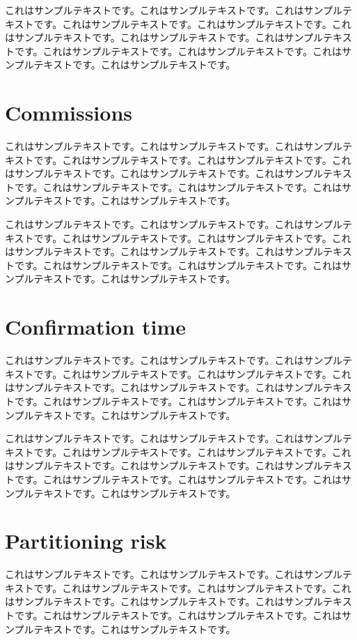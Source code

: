 \documentclass[a4paper, dvipdfmx]{jsarticle}
\begin{document}
これはサンプルテキストです。これはサンプルテキストです。これはサンプルテキストです。これはサンプルテキストです。これはサンプルテキストです。これはサンプルテキストです。これはサンプルテキストです。これはサンプルテキストです。これはサンプルテキストです。これはサンプルテキストです。これはサンプルテキストです。これはサンプルテキストです。

\section{Commissions}
これはサンプルテキストです。これはサンプルテキストです。これはサンプルテキストです。これはサンプルテキストです。これはサンプルテキストです。これはサンプルテキストです。これはサンプルテキストです。これはサンプルテキストです。これはサンプルテキストです。これはサンプルテキストです。これはサンプルテキストです。これはサンプルテキストです。

これはサンプルテキストです。これはサンプルテキストです。これはサンプルテキストです。これはサンプルテキストです。これはサンプルテキストです。これはサンプルテキストです。これはサンプルテキストです。これはサンプルテキストです。これはサンプルテキストです。これはサンプルテキストです。これはサンプルテキストです。これはサンプルテキストです。

\section{Confirmation time}
これはサンプルテキストです。これはサンプルテキストです。これはサンプルテキストです。これはサンプルテキストです。これはサンプルテキストです。これはサンプルテキストです。これはサンプルテキストです。これはサンプルテキストです。これはサンプルテキストです。これはサンプルテキストです。これはサンプルテキストです。これはサンプルテキストです。

これはサンプルテキストです。これはサンプルテキストです。これはサンプルテキストです。これはサンプルテキストです。これはサンプルテキストです。これはサンプルテキストです。これはサンプルテキストです。これはサンプルテキストです。これはサンプルテキストです。これはサンプルテキストです。これはサンプルテキストです。これはサンプルテキストです。

\section{Partitioning risk}
これはサンプルテキストです。これはサンプルテキストです。これはサンプルテキストです。これはサンプルテキストです。これはサンプルテキストです。これはサンプルテキストです。これはサンプルテキストです。これはサンプルテキストです。これはサンプルテキストです。これはサンプルテキストです。これはサンプルテキストです。これはサンプルテキストです。
\end{document}

